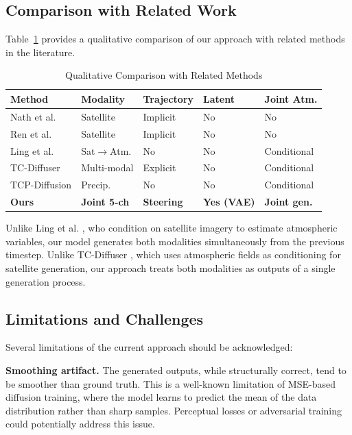 \subsection{Comparison with Related Work}

Table~\ref{tab:comparison} provides a qualitative comparison of our approach with related methods in the literature.

\begin{table}[H]
\centering
\caption{Qualitative Comparison with Related Methods}
\label{tab:comparison}
\begin{tabular}{p{3cm}p{2cm}p{2cm}p{2cm}p{2.5cm}}
\toprule
\textbf{Method} & \textbf{Modality} & \textbf{Trajectory} & \textbf{Latent} & \textbf{Joint Atm.} \\
\midrule
Nath et al. \cite{nath2024forecasting} & Satellite & Implicit & No & No \\
Ren et al. \cite{ren2025improving} & Satellite & Implicit & No & No \\
Ling et al. \cite{ling2024estimating} & Sat$\to$Atm. & No & No & Conditional \\
TC-Diffuser \cite{zhang2025tcdiffuser} & Multi-modal & Explicit & No & Conditional \\
TCP-Diffusion \cite{huang2024tcp} & Precip. & No & No & Conditional \\
\textbf{Ours} & \textbf{Joint 5-ch} & \textbf{Steering} & \textbf{Yes (VAE)} & \textbf{Joint gen.} \\
\bottomrule
\end{tabular}
\end{table}

Unlike Ling et al. \cite{ling2024estimating}, who condition on satellite imagery to estimate atmospheric variables, our model generates both modalities simultaneously from the previous timestep. Unlike TC-Diffuser \cite{zhang2025tcdiffuser}, which uses atmospheric fields as conditioning for satellite generation, our approach treats both modalities as outputs of a single generation process.

\subsection{Limitations and Challenges}

Several limitations of the current approach should be acknowledged:

\textbf{Smoothing artifact.} The generated outputs, while structurally correct, tend to be smoother than ground truth. This is a well-known limitation of MSE-based diffusion training, where the model learns to predict the mean of the data distribution rather than sharp samples. Perceptual losses or adversarial training could potentially address this issue.

